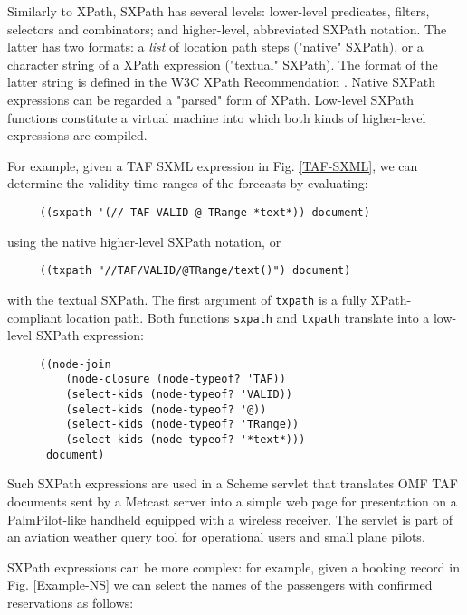 \documentclass[10pt]{llncs}
\begin{document}
Similarly to XPath, SXPath has several levels: lower-level predicates,
filters, selectors and combinators; and higher-level, abbreviated
SXPath notation. The latter has two formats: a \emph{list} of location
path steps ("native" SXPath), or a character string of a XPath
expression ("textual" SXPath). The format of the latter string is
defined in the W3C XPath Recommendation \cite{XPath}. Native SXPath
expressions can be regarded a "parsed" form of XPath.
Low-level SXPath functions constitute a virtual machine into which
both kinds of higher-level expressions are compiled.

For example, given a TAF SXML expression in Fig. \ref{TAF-SXML}, we can determine the validity time ranges of the forecasts
by evaluating:

\begin{verbatim}
     ((sxpath '(// TAF VALID @ TRange *text*)) document)
\end{verbatim}
using the native higher-level SXPath notation, or\begin{verbatim}
     ((txpath "//TAF/VALID/@TRange/text()") document)
\end{verbatim}
with the textual SXPath. The first argument of \texttt{txpath}
is a fully XPath-compliant location path.  Both functions \texttt{sxpath} and \texttt{txpath} translate into a low-level SXPath
expression:\begin{verbatim}
     ((node-join 
         (node-closure (node-typeof? 'TAF))
         (select-kids (node-typeof? 'VALID))
         (select-kids (node-typeof? '@))
         (select-kids (node-typeof? 'TRange))
         (select-kids (node-typeof? '*text*)))
      document)
\end{verbatim}
Such SXPath expressions are used in a Scheme servlet that translates
OMF TAF documents sent by a Metcast server into a simple web page for
presentation on a PalmPilot-like handheld equipped with a wireless
receiver. The servlet is part of an aviation weather query tool 
\cite{total-weather} for operational users and small plane pilots.

SXPath expressions can be more complex: for example, given a
booking record in Fig. \ref{Example-NS} we can select the names
of the passengers with confirmed reservations as follows:
\end{document}
